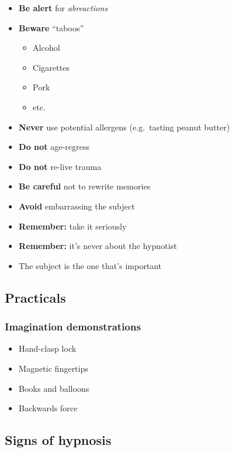 \documentclass{dmistyle}
\begin{document}
\begin{multicols}{2}
\begin{itemize}
	\item \textbf{Be alert} for \emph{abreactions}
	\item \textbf{Beware} ``taboos''
		\begin{itemize}
			\item Alcohol
			\item Cigarettes
			\item Pork
			\item etc.
		\end{itemize}
	\item \textbf{Never} use potential allergens (e.g.\ tasting peanut butter)
	\item \textbf{\color{blue!50!black}Do not} age-regress
	\item \textbf{\color{blue!50!black}Do not} re-live trauma
	\item \textbf{\color{blue!50!black}Be careful} not to rewrite memories
	\item \textbf{Avoid} embarrassing the subject
	\item \textbf{Remember:} take it seriously
	\item \textbf{Remember:} it's never about the hypnotist
	\item The subject is the one that's important
\end{itemize}
\end{multicols}

\subsection{Practicals}

\subsubsection{Imagination demonstrations}

\begin{multicols}{3}
\begin{itemize}
	\item Hand-clasp lock
	\item Magnetic fingertips
	\item Books and balloons
	\item Backwards force
\end{itemize}
\end{multicols}

\subsection{Signs of hypnosis}
\end{document}
